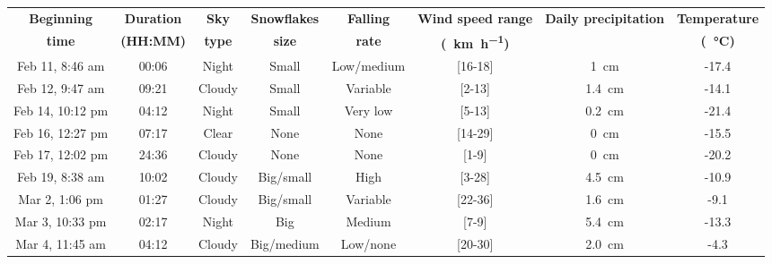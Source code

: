 \begin{table}[htbp]
    \centering
    \begin{tabular}{|c|c|c|c|c|c|c|c|}
        \hline
        \textbf{Beginning} & \textbf{Duration} & \textbf{Sky}  & \textbf{Snowflakes} & \textbf{Falling} & \textbf{Wind speed range}      & \textbf{Daily precipitation} & \textbf{Temperature}     \\
        \textbf{time}      & \textbf{(HH:MM)}  & \textbf{type} & \textbf{size}       & \textbf{rate}    & \textbf{(\SI{}{\km\per\hour})} &                              & \textbf{(\SI{}{\celsius})}      \\\hline
        Feb 11, 8:46 am    &  00:06            & Night         & Small               & Low/medium       & [16-18]                        & \SI{1}{\cm}                  & -17.4 \\\hline
        Feb 12, 9:47 am    &  09:21            & Cloudy        & Small               & Variable         & [2-13]                         & \SI{1.4}{\cm}                & -14.1 \\\hline
        Feb 14, 10:12 pm   &  04:12            & Night         & Small               & Very low         & [5-13]                         & \SI{0.2}{\cm}                & -21.4 \\\hline
        Feb 16, 12:27 pm   &  07:17            & Clear         & None                & None             & [14-29]                        & \SI{0}{\cm}                  & -15.5 \\\hline
        Feb 17, 12:02 pm   &  24:36            & Cloudy        & None                & None             & [1-9]                          & \SI{0}{\cm}                  & -20.2 \\\hline
        Feb 19, 8:38 am    &  10:02            & Cloudy        & Big/small           & High             & [3-28]                         & \SI{4.5}{\cm}                & -10.9 \\\hline
        Mar 2, 1:06 pm     &  01:27            & Cloudy        & Big/small           & Variable         & [22-36]                        & \SI{1.6}{\cm}                & -9.1  \\\hline
        Mar 3, 10:33 pm    &  02:17            & Night         & Big                 & Medium           & [7-9]                          & \SI{5.4}{\cm}                & -13.3 \\\hline
        Mar 4, 11:45 am    &  04:12            & Cloudy        & Big/medium          & Low/none         & [20-30]                        & \SI{2.0}{\cm}                & -4.3  \\\hline

\end{tabular}
\end{table}

